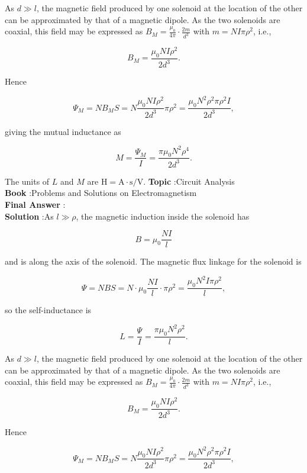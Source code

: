 \documentclass[10pt]{article}
\begin{document}
As $d \gg l$, the magnetic field produced by one solenoid at the location of the other can be approximated by that of a magnetic dipole. As the two solenoids are coaxial, this field may be expressed as $B_{M}=\frac{\mu_{0}}{4 \pi} \cdot \frac{2 m}{d^{3}}$ with $m=N I \pi \rho^{2}$, i.e.,

$$
B_{M}=\frac{\mu_{0} N I \rho^{2}}{2 d^{3}} .
$$

Hence

$$
\Psi_{M}=N B_{M} S=N \frac{\mu_{0} N I \rho^{2}}{2 d^{3}} \pi \rho^{2}=\frac{\mu_{0} N^{2} \rho^{2} \pi \rho^{2} I}{2 d^{3}},
$$



giving the mutual inductance as

$$
M=\frac{\Psi_{M}}{I}=\frac{\pi \mu_{0} N^{2} \rho^{4}}{2 d^{3}} .
$$

The units of $L$ and $M$ are $\mathrm{H}=\mathrm{A} \cdot \mathrm{s} / \mathrm{V}$.
\textbf{Topic} :Circuit Analysis\\
\textbf{Book} :Problems and Solutions on Electromagnetism\\
\textbf{Final Answer} :\\


\textbf{Solution} :As $l \gg \rho$, the magnetic induction inside the solenoid has

$$
B=\mu_{0} \frac{N I}{l}
$$

and is along the axis of the solenoid. The magnetic flux linkage for the solenoid is

$$
\Psi=N B S=N \cdot \mu_{0} \frac{N I}{l} \cdot \pi \rho^{2}=\frac{\mu_{0} N^{2} I \pi \rho^{2}}{l},
$$

so the self-inductance is

$$
L=\frac{\Psi}{I}=\frac{\pi \mu_{0} N^{2} \rho^{2}}{l} .
$$

As $d \gg l$, the magnetic field produced by one solenoid at the location of the other can be approximated by that of a magnetic dipole. As the two solenoids are coaxial, this field may be expressed as $B_{M}=\frac{\mu_{0}}{4 \pi} \cdot \frac{2 m}{d^{3}}$ with $m=N I \pi \rho^{2}$, i.e.,

$$
B_{M}=\frac{\mu_{0} N I \rho^{2}}{2 d^{3}} .
$$

Hence

$$
\Psi_{M}=N B_{M} S=N \frac{\mu_{0} N I \rho^{2}}{2 d^{3}} \pi \rho^{2}=\frac{\mu_{0} N^{2} \rho^{2} \pi \rho^{2} I}{2 d^{3}},
$$
\end{document}
